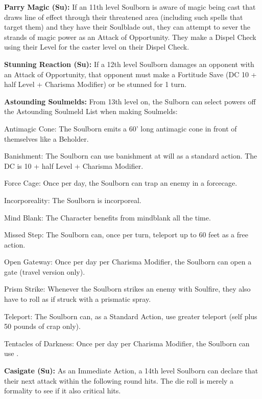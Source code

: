 \textbf{Parry Magic (Su):} If an 11th level Soulborn is aware of magic being cast that draws line of effect through their threatened area (including such spells that target them) and they have their Soulblade out, they can attempt to sever the strands of magic power as an Attack of Opportunity. They make a Dispel Check using their Level for the caster level on their Dispel Check.

\textbf{Stunning Reaction (Su):} If a 12th level Soulborn damages an opponent with an Attack of Opportunity, that opponent must make a Fortitude Save (DC 10 + half Level + Charisma Modifier) or be stunned for 1 turn.

\textbf{Astounding Soulmelds:} From 13th level on, the Sulborn can select powers off the Astounding Soulmeld List when making Soulmelds:
\begin{description*}
\item[Antimagic Cone:] The Soulborn emits a 60' long antimagic cone in front of themselves like a Beholder.
\item[Banishment:] The Soulborn can use banishment at will as a standard action. The DC is 10 + half Level + Charisma Modifier.
\item[Force Cage:] Once per day, the Soulborn can trap an enemy in a forcecage.
\item[Incorporeality:] The Soulborn is incorporeal.
\item[Mind Blank:] The Character benefits from mindblank all the time.
\item[Missed Step:] The Soulborn can, once per turn, teleport up to 60 feet as a free action.
\item[Open Gateway:] Once per day per Charisma Modifier, the Soulborn can open a gate (travel version only).
\item[Prism Strike:] Whenever the Soulborn strikes an enemy with Soulfire, they also have to roll as if struck with a prismatic spray.
\item[Teleport:] The Soulborn can, as a Standard Action, use greater teleport (self plus 50 pounds of crap only).
\item[Tentacles of Darkness:] Once per day per Charisma Modifier, the Soulborn can use .
\end{description*}

\textbf{Casigate (Su):} As an Immediate Action, a 14th level Soulborn can declare that their next attack within the following round hits. The die roll is merely a formality to see if it also critical hits.

